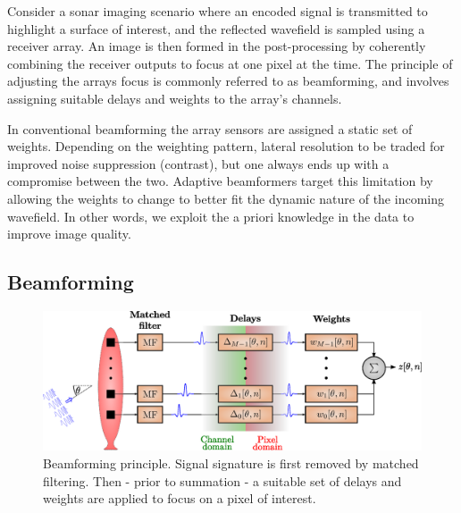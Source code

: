 \documentclass[12pt,journal,captionsoff,onecolumn]{IEEEtran}
\let\MYoriglatexcaption\caption               %
\renewcommand{\caption}[2][\relax]{\MYoriglatexcaption[#2]{#2}}
\newcommand\1{\vec 1}
\begin{document}
Consider a sonar imaging scenario where an encoded signal is transmitted to highlight a surface of interest, and the reflected wavefield is sampled using a receiver array. An image is then formed in the post-processing by coherently combining the receiver outputs to focus at one pixel at the time. The principle of adjusting the arrays focus is commonly referred to as beamforming, and involves assigning suitable delays and weights to the array's channels.

In conventional beamforming the array sensors are assigned a static set of weights. Depending on the weighting pattern, lateral resolution to be traded for improved noise suppression (contrast), but one always ends up with a compromise between the two. Adaptive beamformers target this limitation by allowing the weights to change to better fit the dynamic nature of the incoming wavefield. In other words, we exploit the a priori knowledge in the data to improve image quality.

\subsection{Beamforming}

\begin{figure}[!t]\centering
\includegraphics[width=\linewidth]{gfx/beamforming.eps}
\caption{Beamforming principle. Signal signature is first removed by matched filtering. Then - prior to summation - a suitable set of delays and weights are applied to focus on a pixel of interest.}\label{beamforming}
\end{figure}
\end{document}

